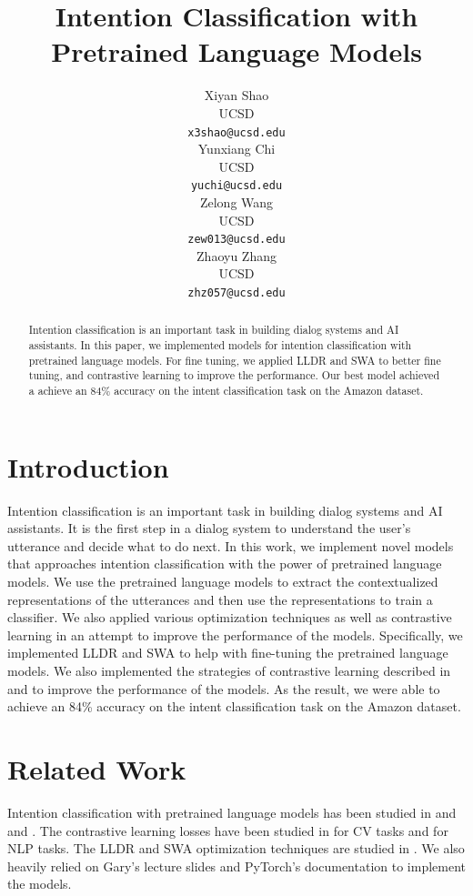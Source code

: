\documentclass{article}
\title{Intention Classification with Pretrained Language Models}
\author{%
    Xiyan Shao \\
    UCSD \\
    \texttt{x3shao@ucsd.edu} \\
    \And
    Yunxiang Chi \\
    UCSD \\
    \texttt{yuchi@ucsd.edu} \\
    \And
    Zelong Wang\\
    UCSD \\
    \texttt{zew013@ucsd.edu} \\
    \And
    Zhaoyu Zhang\\
    UCSD \\
    \texttt{zhz057@ucsd.edu} \\
}
\begin{document}
    \maketitle

    \begin{abstract}
    Intention classification is an important task in building dialog systems and AI assistants.
    In this paper, we implemented models for intention classification with pretrained language models.
    For fine tuning, we applied LLDR and SWA to better fine tuning, and contrastive learning to improve the performance.
    Our best model achieved a achieve an 84\% accuracy on the intent classification task on the Amazon dataset.

    \end{abstract}


    \section{Introduction}

    Intention classification is an important task in building dialog systems and AI assistants.
    It is the first step in a dialog system to understand the user's utterance and decide what to do next.
    In this work, we implement novel models that approaches intention classification with the power of pretrained language models.
    We use the pretrained language models to extract the contextualized representations of the utterances and then use the representations to train a classifier.
    We also applied various optimization techniques as well as contrastive learning in an attempt to improve the performance of the models.
    Specifically, we implemented LLDR and SWA to help with fine-tuning the pretrained language models.
    We also implemented the strategies of contrastive learning described in \cite{gaoSimCSESimpleContrastive2022} and \cite{khoslaSupervisedContrastiveLearning2021} to improve the performance of the models.
    As the result, we were able to achieve an 84\% accuracy on the intent classification task on the Amazon dataset.


    \section{Related Work}

    Intention classification with pretrained language models has been studied in \cite{chenBERTJointIntent2019} and \cite{larsonEvaluationDatasetIntent2019}
    and \cite{wuTODBERTPretrainedNatural2020}.
    The contrastive learning losses have been studied in \cite{khoslaSupervisedContrastiveLearning2021} for CV tasks and \cite{gaoSimCSESimpleContrastive2022} for NLP tasks.
    The LLDR and SWA optimization techniques are studied in \cite{changAdvancedTechniquesFinetuning2021}.
    We also heavily relied on Gary's lecture slides and PyTorch's documentation to implement the models.
\end{document}

